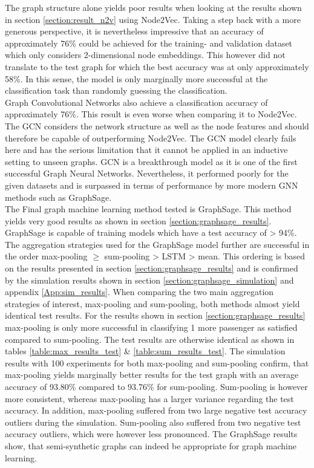   \noindent The graph structure alone yields poor results when looking at the 
  results shown in section \ref{section:result_n2v} using Node2Vec. Taking a 
  step back with a more generous perspective, it is nevertheless impressive that 
  an accuracy of approximately 76\% could be achieved for the training- and 
  validation dataset which only considers 2-dimensional node embeddings. This 
  however did not translate to the test graph for which the best accuracy was at 
  only approximately 58\%. In this sense, the model is only marginally more 
  successful at the classification task than randomly guessing the 
  classification. \\

  \noindent Graph Convolutional Networks also achieve a classification 
  accuracy of approximately 76\%. This result is even worse when comparing it
  to Node2Vec. The GCN considers the network structure as well as the node 
  features and should therefore be capable of outperforming Node2Vec. The GCN 
  model clearly fails here and has the serious limitation that it cannot be 
  applied in an inductive setting to unseen graphs. GCN is a breakthrough model 
  as it is one of the first successful Graph Neural Networks. Nevertheless, it 
  performed poorly for the given datasets and is surpassed in terms of 
  performance by more modern GNN methods such as GraphSage. \\

  \noindent The Final graph machine learning method tested is GraphSage. This
  method yields very good results as shown in section 
  \ref{section:graphsage_results}. GraphSage is capable of training models
  which have a test accuracy of > 94\%. The aggregation strategies used for the
  GraphSage model further are successful in the order max-pooling $\geqslant$ 
  sum-pooling > LSTM > mean. This ordering is based on the results presented in 
  section \ref{section:graphsage_results} and is confirmed by the simulation 
  results shown in section \ref{section:graphsage_simulation} and appendix
  \ref{App:sim_results}. 
  When comparing the two main aggregation strategies of interest, max-pooling 
  and sum-pooling, both methods almost yield identical test results. For the
  results shown in section \ref{section:graphsage_results} max-pooling is only 
  more successful in classifying 1 more passenger as satisfied compared to
  sum-pooling. The test results are otherwise identical as shown in tables 
  \ref{table:max_results_test} \& \ref{table:sum_results_test}. The simulation
  results with 100 experiments for both max-pooling and sum-pooling confirm,
  that max-pooling yields marginally better results for the test graph with an
  average accuracy of 93.80\% compared to 93.76\% for sum-pooling. Sum-pooling
  is however more consistent, whereas max-pooling has a larger variance 
  regarding the test accuracy. In addition, max-pooling suffered from two large 
  negative test accuracy outliers during the simulation. Sum-pooling also 
  suffered from two negative test accuracy outliers, which were however less 
  pronounced. The GraphSage results show, that semi-synthetic graphs can indeed 
  be appropriate for graph machine learning.

